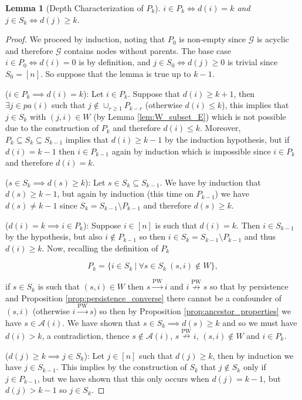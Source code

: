 \documentclass{statsoc}
\def\pwgc{\overset{\text{PW}}{\rightarrow}}  %
\def\npwgc{\overset{\text{PW}}{\nrightarrow}}  %
\def\gcg{\mathcal{G}}  %
\newcommand{\pa}[1]{pa(#1)}  %
\newcommand{\anc}[1]{\mathcal{A}(#1)}  %
\newtheorem{lemma}{Lemma}
\begin{document}
\begin{lemma}[Depth Characterization of $P_k$]
  \label{lem:depth_lemma}
  $i \in P_k \iff d(i) = k$ and $j \in S_k \iff d(j) \ge k$.
\end{lemma}
\begin{proof}
  We proceed by induction, noting that $P_0$ is non-empty since $\gcg$
  is acyclic and therefore $\gcg$ contains nodes without parents.  The
  base case $i \in P_0 \iff d(i) = 0$ is by definition, and
  $j \in S_0 \iff d(j) \ge 0$ is trivial since $S_0 = [n]$.  So
  suppose that the lemma is true up to $k - 1$.

  ($i \in P_k \implies d(i) = k$): Let $i \in P_k$.  Suppose that
  $d(i) \ge k + 1$, then $\exists j \in \pa{i}$ such that
  $j \not\in \cup_{r \ge 1}P_{k - r}$ (otherwise $d(i) \le k$), this
  implies that $j \in S_k$ with $(j, i) \in W$ (by Lemma
  \ref{lem:W_subset_E}) which is not possible due to the construction of
  $P_k$ and therefore $d(i) \le k$.  Moreover,
  $P_k \subseteq S_k \subseteq S_{k - 1}$ implies that
  $d(i) \ge k - 1$ by the induction hypothesis, but if $d(i) = k - 1$
  then $i \in P_{k - 1}$ again by induction which is impossible since
  $i \in P_k$ and therefore $d(i) = k$.

  ($s \in S_k \implies d(s) \ge k$): Let
  $s \in S_k \subseteq S_{k - 1}$.  We have by induction that
  $d(s) \ge k - 1$, but again by induction (this time on $P_{k - 1}$)
  we have $d(s) \ne k - 1$ since $S_k = S_{k - 1} \setminus P_{k - 1}$
  and therefore $d(s) \ge k$.

  ($d(i) = k \implies i \in P_k$): Suppose $i \in [n]$ is such that
  $d(i) = k$.  Then $i \in S_{k - 1}$ by the hypothesis, but also
  $i \not\in P_{k - 1}$ so then
  $i \in S_k = S_{k - 1} \setminus P_{k - 1}$ and thus $d(i) \ge k$.
  Now, recalling the definition of $P_k$

  \begin{equation*}
    P_k = \{i \in S_k\ |\ \forall s \in S_k\ (s, i) \not\in W \},
  \end{equation*}

  if $s \in S_k$ is such that $(s, i) \in W$ then $s \pwgc i$ and
  $i \npwgc s$ so that by persistence and Proposition
  \ref{prop:persistence_converse} there cannot be a confounder of
  $(s, i)$ (otherwise $i \pwgc s$) so then by Proposition
  \ref{prop:ancestor_properties} we have $s \in \anc{i}$.  We have
  shown that $s \in S_k \implies d(s) \ge k$ and so we must have
  $d(i) > k$, a contradiction, thence $s \not\in \anc{i}$,
  $s \npwgc i$, $(s, i) \not\in W$ and $i \in P_k$.

  ($d(j) \ge k \implies j \in S_k$): Let $j \in [n]$ such that
  $d(j) \ge k$, then by induction we have $j \in S_{k - 1}$.  This
  implies by the construction of $S_k$ that $j \not\in S_k$ only if
  $j \in P_{k - 1}$, but we have shown that this only occurs when
  $d(j) = k - 1$, but $d(j) > k - 1$ so $j \in S_k$.
\end{proof}
\end{document}
